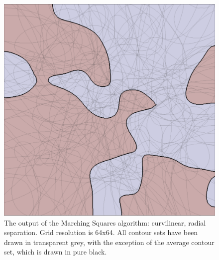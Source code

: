\documentclass[12pt]{article}
\begin{document}
\begin{figure} 
\centering
  \includegraphics[width = 3 in]{10blur.png}
  \caption{The output of the Marching Squares algorithm: curvilinear, radial separation. 
Grid resolution is 64x64.
All contour sets have been drawn in transparent grey, with the exception of the average contour set, which is drawn in pure black.
}
\end{figure}
\end{document}
